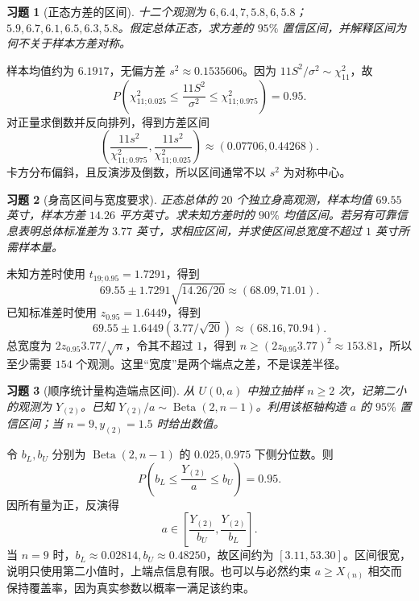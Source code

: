 \documentclass[12pt,fontset=fandol]{ctexart}
\newtheorem{exercise}{习题}[section]
\begin{document}
\begin{exercise}[正态方差的区间]\label{q:M-P10-3}
十二个观测为 $6,6.4,7,5.8,6,5.8$；$5.9,6.7,6.1,6.5,6.3,5.8$。假定总体正态，求方差的 $95\%$ 置信区间，并解释区间为何不关于样本方差对称。\par{}
\end{exercise}

\begin{solve}\label{a:M-P10-3}样本均值约为 $6.1917$，无偏方差 $s^2\approx0.1535606$。因为 $11S^2/\sigma^2\sim\chi^2_{11}$，故\[P\left(\chi^2_{11;0.025}\le\frac{11S^2}{\sigma^2}\le\chi^2_{11;0.975}\right)=0.95.\]对正量求倒数并反向排列，得到方差区间\[\left(\frac{11s^2}{\chi^2_{11;0.975}},\frac{11s^2}{\chi^2_{11;0.025}}\right)\approx(0.07706,0.44268).\]卡方分布偏斜，且反演涉及倒数，所以区间通常不以 $s^2$ 为对称中心。\end{solve}

\begin{exercise}[身高区间与宽度要求]\label{q:M-P11-1}
正态总体的 $20$ 个独立身高观测，样本均值 $69.55$ 英寸，样本方差 $14.26$ 平方英寸。求未知方差时的 $90\%$ 均值区间。若另有可靠信息表明总体标准差为 $3.77$ 英寸，求相应区间，并求使区间总宽度不超过 $1$ 英寸所需样本量。\par{}
\end{exercise}

\begin{solve}\label{a:M-P11-1}未知方差时使用 $t_{19;0.95}=1.7291$，得到\[69.55\pm1.7291\sqrt{14.26/20}\approx(68.09,71.01).\]已知标准差时使用 $z_{0.95}=1.6449$，得到\[69.55\pm1.6449(3.77/\sqrt{20})\approx(68.16,70.94).\]总宽度为 $2z_{0.95}3.77/\sqrt n$，令其不超过 $1$，得到 $n\ge(2z_{0.95}3.77)^2\approx153.81$，所以至少需要 $154$ 个观测。这里“宽度”是两个端点之差，不是误差半径。\end{solve}

\begin{exercise}[顺序统计量构造端点区间]\label{q:M-P11-2}
从 $U(0,a)$ 中独立抽样 $n\ge2$ 次，记第二小的观测为 $Y_{(2)}$。已知 $Y_{(2)}/a\sim\operatorname{Beta}(2,n-1)$。利用该枢轴构造 $a$ 的 $95\%$ 置信区间；当 $n=9,y_{(2)}=1.5$ 时给出数值。\par{}
\end{exercise}

\begin{solve}\label{a:M-P11-2}令 $b_L,b_U$ 分别为 $\operatorname{Beta}(2,n-1)$ 的 $0.025,0.975$ 下侧分位数。则\[P\left(b_L\le\frac{Y_{(2)}}a\le b_U\right)=0.95.\]因所有量为正，反演得\[a\in\left[\frac{Y_{(2)}}{b_U},\frac{Y_{(2)}}{b_L}\right].\]当 $n=9$ 时，$b_L\approx0.02814,b_U\approx0.48250$，故区间约为 $[3.11,53.30]$。区间很宽，说明只使用第二小值时，上端点信息有限。也可以与必然约束 $a\ge X_{(n)}$ 相交而保持覆盖率，因为真实参数以概率一满足该约束。\end{solve}
\end{document}
